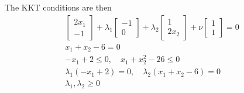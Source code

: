 The KKT conditions are then
\begin{align}
  \begin{bmatrix}
     2x_1 \\ -1
  \end{bmatrix} 
  +
  \lambda_1
  \begin{bmatrix}
    -1 \\ 0
  \end{bmatrix}
  +
  \lambda_2
  \begin{bmatrix}
    1 \\ 2x_2
  \end{bmatrix}
  +
  \nu
  \begin{bmatrix}
    1 \\ 1
  \end{bmatrix}
  = 0 
  \\
  x_1 + x_2 - 6 = 0
  \\
  -x_1 + 2 \leq 0, \quad
   x_1 + x_2^2 - 26 \leq 0
  \\
  \lambda_1 (-x_1 + 2) = 0, \quad 
  \lambda_2 (x_1 + x_2 -6) = 0 
  \\
  \lambda_1, \lambda_2 \geq 0
\end{align}